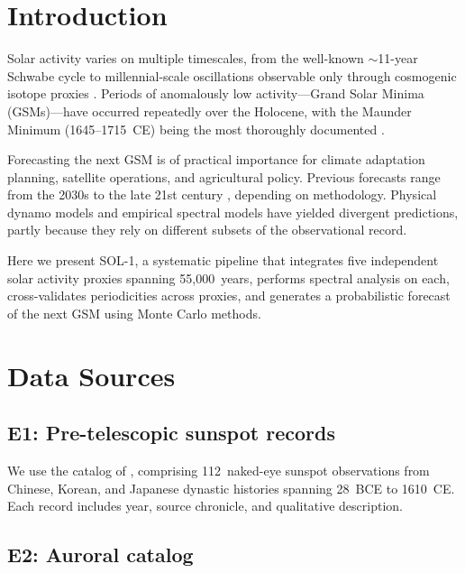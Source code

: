 \documentclass[twocolumn,preprintnumbers,amsmath,amssymb]{revtex4-2}
\begin{document}
\section{Introduction}
\label{sec:intro}

Solar activity varies on multiple timescales, from the well-known $\sim$11-year Schwabe cycle to millennial-scale oscillations observable only through cosmogenic isotope proxies \citep{Usoskin2017}. Periods of anomalously low activity---Grand Solar Minima (GSMs)---have occurred repeatedly over the Holocene, with the Maunder Minimum (1645--1715~CE) being the most thoroughly documented \citep{Eddy1976}.

Forecasting the next GSM is of practical importance for climate adaptation planning, satellite operations, and agricultural policy. Previous forecasts range from the 2030s \citep{Zharkova2015,Shepherd2014} to the late 21st century \citep{Steinhilber2013}, depending on methodology. Physical dynamo models \citep{Zharkova2015} and empirical spectral models \citep{Steinhilber2013} have yielded divergent predictions, partly because they rely on different subsets of the observational record.

Here we present SOL-1, a systematic pipeline that integrates five independent solar activity proxies spanning 55,000~years, performs spectral analysis on each, cross-validates periodicities across proxies, and generates a probabilistic forecast of the next GSM using Monte Carlo methods.

\section{Data Sources}
\label{sec:data}

\subsection{E1: Pre-telescopic sunspot records}

We use the catalog of \citet{Yau1988}, comprising 112~naked-eye sunspot observations from Chinese, Korean, and Japanese dynastic histories spanning 28~BCE to 1610~CE. Each record includes year, source chronicle, and qualitative description.

\subsection{E2: Auroral catalog}
\end{document}
